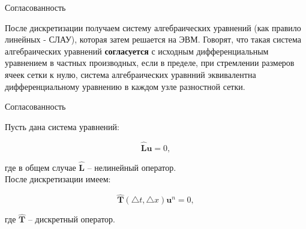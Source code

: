 \documentclass[10pt,xcolor=pst,aspectratio=169]{beamer}
\begin{document}
%
%
%

\begin{frame}{Согласованность}

	\transdissolve[duration=0.1]
	\justifying
	\large

	После дискретизации получаем систему алгебраических уравнений (как правило линейных - СЛАУ), которая затем решается на ЭВМ. Говорят, что такая система алгебраических уравнений \textbf{согласуется} с исходным дифференциальным уравнением в частных производных, если в пределе, при стремлении размеров ячеек сетки к нулю, система алгебраических уравнний эквивалентна дифференциальному уравнению в каждом  узле разностной сетки.

\end{frame}

\begin{frame}{Согласованность}

	\transdissolve[duration=0.1]
	\justifying
	\large

	Пусть дана система уравнений:


	\[
        \hat{\textbf{L}} \textbf{u} = 0,
	\]
	
	где в общем случае $\hat{\textbf{L}}$ -- нелинейный оператор.\\

	После дискретизации имеем:


	\[
		\hat{\textbf{T}} (\triangle t, \triangle x) \textbf{u}^{n} = 0,
	\]

	где $\hat{\textbf{T}}$ -- дискретный оператор.

\end{frame}
\end{document}
